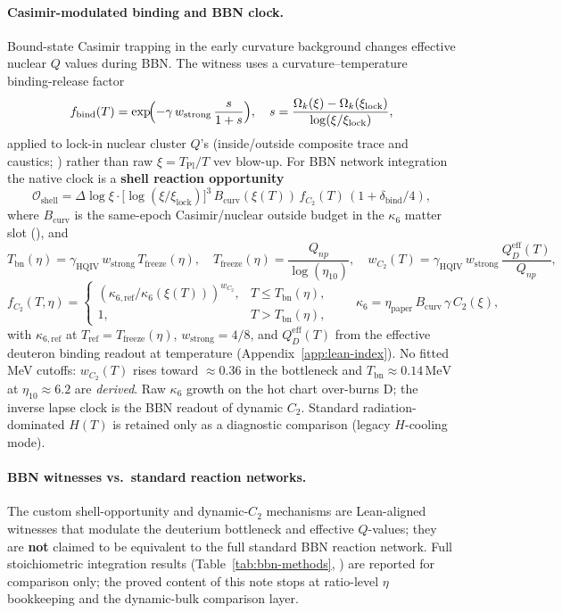 \documentclass[11pt]{amsart}
\begin{document}
\paragraph{Casimir-modulated binding and BBN clock.}
Bound-state Casimir trapping in the early curvature background changes
effective nuclear $Q$ values during BBN. The witness uses a
curvature--temperature binding-release factor
\[
f_{\mathrm{bind}}(T)=\exp\!\Bigl(-\gamma\,w_{\mathrm{strong}}\,
  \frac{s}{1+s}\Bigr),
\quad
s=\frac{\Omega_k(\xi)-\Omega_k(\xi_{\mathrm{lock}})}
  {\log(\xi/\xi_{\mathrm{lock}})},
\]
applied to lock-in nuclear cluster $Q$'s (inside/outside composite trace and
caustics; \cite{hqiv-nucleon-binding-paper}) rather than raw
$\xi=T_{\mathrm{Pl}}/T$ vev blow-up. For BBN network integration the native clock is a \textbf{shell reaction
opportunity}
\[
\mathcal{O}_{\mathrm{shell}}=
  \Delta\log\xi\cdot\bigl[\log(\xi/\xi_{\mathrm{lock}})\bigr]^3\,
  B_{\mathrm{curv}}(\xi(T))\,
  f_{C_2}(T)\,(1+\delta_{\mathrm{bind}}/4),
\]
where $B_{\mathrm{curv}}$ is the same-epoch Casimir/nuclear outside budget
in the $\kappa_6$ matter slot (\cite{hqiv-tuft-sm-lagrangian-paper}), and
\[
T_{\mathrm{bn}}(\eta)=\gamma_{\mathrm{HQIV}}\,w_{\mathrm{strong}}\,T_{\mathrm{freeze}}(\eta),
\quad
T_{\mathrm{freeze}}(\eta)=\frac{Q_{np}}{\log(\eta_{10})},
\quad
w_{C_2}(T)=\gamma_{\mathrm{HQIV}}\,w_{\mathrm{strong}}\,\frac{Q_D^{\mathrm{eff}}(T)}{Q_{np}},
\]
\[
f_{C_2}(T,\eta)=
\begin{cases}
(\kappa_{6,\mathrm{ref}}/\kappa_6(\xi(T)))^{w_{C_2}}, & T\le T_{\mathrm{bn}}(\eta),\\
1, & T>T_{\mathrm{bn}}(\eta),
\end{cases}
\qquad
\kappa_6=\eta_{\mathrm{paper}}\,B_{\mathrm{curv}}\,\gamma\,C_2(\xi),
\]
with $\kappa_{6,\mathrm{ref}}$ at $T_{\mathrm{ref}}=T_{\mathrm{freeze}}(\eta)$,
$w_{\mathrm{strong}}=4/8$, and $Q_D^{\mathrm{eff}}(T)$ from the
effective deuteron binding readout at temperature
(Appendix~\ref{app:lean-index}). No fitted MeV cutoffs: $w_{C_2}(T)$ rises toward
$\approx 0.36$ in the bottleneck and $T_{\mathrm{bn}}\approx 0.14\,\mathrm{MeV}$
at $\eta_{10}\approx 6.2$ are \emph{derived}. Raw $\kappa_6$ growth on the hot
chart over-burns D; the inverse lapse clock is the BBN readout of dynamic $C_2$.
Standard
radiation-dominated $H(T)$ is retained only as a diagnostic comparison
(legacy $H$-cooling mode).

\paragraph{BBN witnesses vs.\ standard reaction networks.}
The custom shell-opportunity and dynamic-$C_2$ mechanisms are Lean-aligned
witnesses that modulate the deuterium bottleneck and effective $Q$-values;
they are \textbf{not} claimed to be equivalent to the full standard BBN
reaction network. Full stoichiometric integration results
(Table~\ref{tab:bbn-methods}, \cite{hqiv-bbn-paper}) are reported for
comparison only; the proved content of this note stops at ratio-level
$\eta$ bookkeeping and the dynamic-bulk comparison layer.
\end{document}
